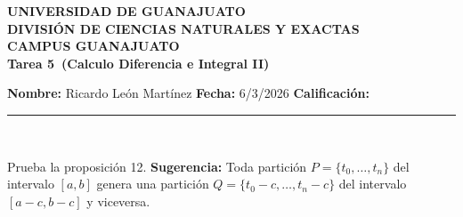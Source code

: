 \documentclass[12pt,a4paper]{article}
\newcommand{\alumno}{Ricardo León Martínez}
\newcommand{\materia}{Calculo Diferencia e Integral II}
\newcommand{\tarea}{Tarea 5}
\newcommand{\fecha}{6/3/2026}
\begin{document}
    \begin{center}
    {\large\textbf{UNIVERSIDAD DE GUANAJUATO}}\\[0.3cm]
    {\normalsize\textbf{DIVISIÓN DE CIENCIAS NATURALES Y EXACTAS}}\\
    {\normalsize\textbf{CAMPUS GUANAJUATO}}\\[1cm]

    {\Large\textbf{\tarea\ (\materia)}}\\[1cm]
    \end{center}

    \textbf{Nombre:} \alumno \hfill 
    \textbf{Fecha:} \fecha \hfill 
    \textbf{Calificación:} \rule{3cm}{0.4pt} \\[0.3cm]

    \begin{mdframed}[style=mdbluebox,frametitle={Ejercicio 1}]
        Prueba la proposición 12. \textbf{Sugerencia:} Toda partición $P=\{t_{0},\dots,t_{n}\}$ del intervalo $[a,b]$ genera una partición
        $Q=\{t_{0}-c,\dots,t_{n}-c\}$ del intervalo $[a-c,b-c]$ y viceversa.
    \end{mdframed}
\end{document}
